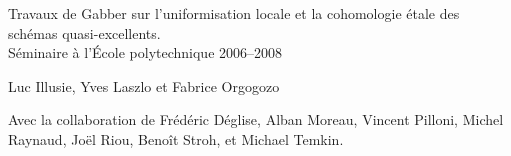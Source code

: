 \documentclass[12pt]{amsbook-arxiv}
\begin{document}
\begin{center}
{\Large Travaux de Gabber sur l'uniformisation locale et la cohomologie
étale des schémas quasi-excellents.\\
Séminaire à l'École polytechnique 2006--2008}
\end{center}

\vskip1cm
\begin{center}
Luc Illusie, Yves Laszlo et Fabrice Orgogozo
\end{center}

\vskip1cm
\begin{center}
Avec la collaboration de Frédéric Déglise, Alban Moreau, Vincent Pilloni, Michel Raynaud,
Joël Riou, Benoît Stroh, et Michael Temkin.
\end{center}


\tableofcontents

\mainmatter

\def\danslelivre{1}
\def\cacheretiquettes{1}


\setcounter{chapter}{-1}

\setcounter{chapter}{0}
\def\thechapter{\Roman{chapter}}

















\renewcommand*{\thechapter}{XVIII-A}

\renewcommand*{\thechapter}{XVIII-B}

\renewcommand*{\thechapter}{XIX}

\renewcommand*{\thechapter}{XX}

\renewcommand*{\thechapter}{XXI}


\backmatter



\end{document}
